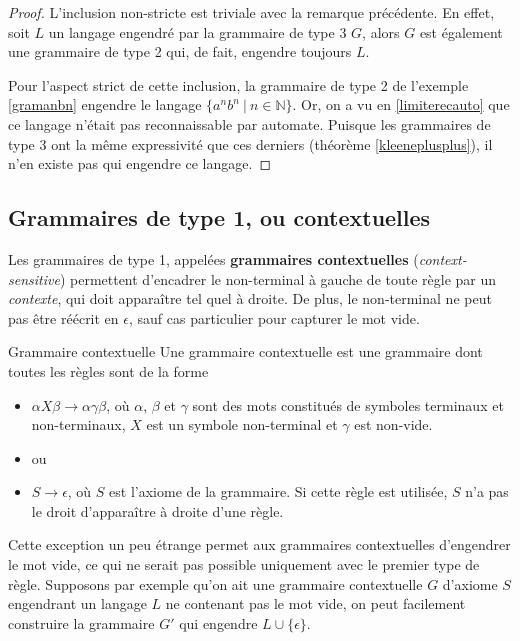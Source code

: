 \begin{proof}
L'inclusion non-stricte est triviale avec la remarque précédente. En effet, soit $L$ un langage engendré par la grammaire de type 3 $G$, alors $G$ est également une grammaire de type 2 qui, de fait, engendre toujours $L$.

Pour l'aspect strict de cette inclusion, la grammaire de type 2 de l'exemple \ref{gramanbn} engendre le langage $\{a^nb^n ~|~ n \in \mathbb{N}\}$. Or, on a vu en \ref{limiterecauto} que ce langage n'était pas reconnaissable par automate. Puisque les grammaires de type 3 ont la même expressivité que ces derniers (théorème \ref{kleeneplusplus}), il n'en existe pas qui engendre ce langage.
\end{proof}




\subsection{Grammaires de type 1, ou contextuelles}

Les grammaires de type 1, appelées \textbf{grammaires contextuelles} (\textit{context-sensitive}) permettent d'encadrer le non-terminal à gauche de toute règle par un \textit{contexte}, qui doit apparaître tel quel à droite. De plus, le non-terminal ne peut pas être réécrit en $\epsilon$, sauf cas particulier pour capturer le mot vide.

\begin{definition}{Grammaire contextuelle}{}
Une grammaire contextuelle est une grammaire dont toutes les règles sont de la forme 
\begin{itemize}
\item[] $\alpha X \beta \rightarrow \alpha \gamma \beta$, où $\alpha$, $\beta$ et $\gamma$ sont des mots constitués de symboles terminaux et non-terminaux, $X$ est un symbole non-terminal et $\gamma$ est non-vide. 
\item[] ou
\item[] $S \rightarrow \epsilon$, où $S$ est l'axiome de la grammaire. Si cette règle est utilisée, $S$ n'a pas le droit d'apparaître à droite d'une règle.
\end{itemize}

\end{definition}

Cette exception un peu étrange permet aux grammaires contextuelles d'engendrer le mot vide, ce qui ne serait pas possible uniquement avec le premier type de règle. Supposons par exemple qu'on ait une grammaire contextuelle $G$ d'axiome $S$ engendrant un langage $L$ ne contenant pas le mot vide, on peut facilement construire la grammaire $G'$ qui engendre $L \cup \{\epsilon\}$. 

